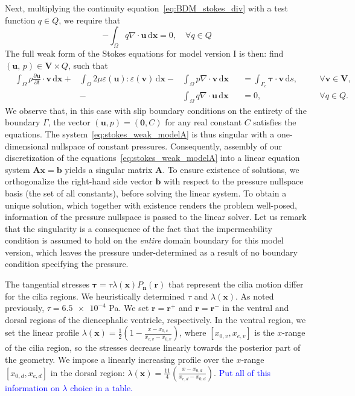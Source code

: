 \documentclass[fleqn]{wlscirep}
\newcommand{\pdifft}[1]{\frac{\partial  #1}{\partial t}}
\newcommand{\intO}[1]{\int_{\Omega}#1 \, \mathrm d\bm{x}}
\newcommand{\intGc}[1]{\int_{\Gamma_c}#1 \, \mathrm ds}
\newcommand{\nn}{\mathbf{n}}
\newcommand{\rr}{\mathbf{r}}
\newcommand{\uu}{\mathbf{u}}
\newcommand{\vv}{\mathbf{v}}
\newcommand{\xx}{\bm{x}}
\newcommand{\VV}{\mathbf{V}}
\newcommand{\btau}{\bm{\tau}}
\newcommand{\lyng}[1]{\textcolor{blue}{#1}}
\begin{document}
Next, multiplying the continuity equation~\eqref{eq:BDM_stokes_div} with a test function $q\in Q$, we require that
\begin{equation}
    -\intO{q\nabla\cdot\uu} = 0,\quad\forall q\in Q
    \label{eq:pressure_weak_form}
\end{equation}
The full weak form of the Stokes equations for model version I is then: find $(\uu, \, p) \in \VV\times Q$, such that
\begin{subequations}
    \begin{alignat}{5}
        &\intO{\rho\pdifft{\uu}\cdot\vv} + &\intO{2\mu\varepsilon(\uu) : \varepsilon(\vv)} - &\intO{p\nabla\cdot\vv} &&= \intGc{\btau\cdot\vv}, &&\quad\forall\vv\in\VV, \label{eq:stokes_weak_mom_modelA}\\ 
        &{} &{}  -&\intO{q\nabla\cdot\uu} &&= 0, &&\quad\forall q\in Q. \label{eq:stokes_weak_cont_modelA}
    \end{alignat}%
    \label{eq:stokes_weak_modelA}%
\end{subequations}%
We observe that, in this case with slip boundary conditions on the entirety of the boundary $\Gamma$, the
vector $(\uu, p)=(\mathbf{0}, C)$ for any real constant $C$ satisfies the equations. The system~\eqref{eq:stokes_weak_modelA} is thus singular with a one-dimensional nullspace of constant pressures. Consequently, assembly of our discretization of the  equations~\eqref{eq:stokes_weak_modelA} into a linear equation system $\mathbf{A}\xx=\mathbf{b}$ yields a singular matrix $\mathbf{A}$. To ensure existence of solutions, we orthogonalize the right-hand side vector $\mathbf{b}$ with respect to the pressure nullspace basis (the set of all constants), before solving the linear system. To obtain a unique solution, which together with existence renders the problem well-posed, information of the pressure nullspace is passed to the linear solver. Let us remark that the singularity is a consequence of the fact that the impermeability condition is assumed to hold on the \emph{entire} domain boundary for this model version, which leaves the pressure under-determined as a result of no boundary condition specifying the pressure.

The tangential stresses $\btau = \tau\lambda(\xx) P_{\nn}(\rr)$ that represent the cilia motion differ for the cilia regions. We heuristically determined $\tau$ and $\lambda(\xx)$. As noted previously, $\tau=\num{6.5e-4}$ Pa. We set $\rr = \rr^+$ and $\rr = \rr^-$ in the ventral and dorsal regions of the diencephalic ventricle, respectively. In the ventral region, we set the linear profile $\lambda(\xx) = \frac{1}{2}\left(1 - \frac{x-x_{0, v}}{x_{e, v} - x_{0, v}}\right)$, where $[x_{0, v}, x_{e, v}]$ is the $x$-range of the cilia region, so the stresses decrease linearly towards the posterior part of the geometry. We impose a linearly increasing profile over the $x$-range $[x_{0, d}, x_{e, d}]$ in the dorsal region: $\lambda(\xx)=\frac{11}{4}\left(\frac{x-x_{0, d}}{x_{e, d} - x_{0, d}}\right)$. \lyng{Put all of this information on $\lambda$ choice in a table.}
\end{document}
